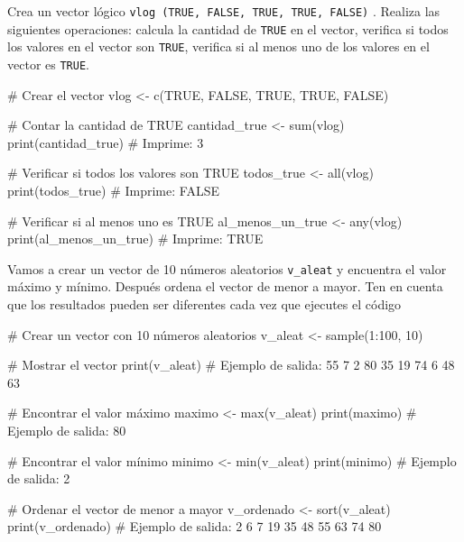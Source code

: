 \documentclass[
  letterpaper,
]{scrbook}
\newenvironment{Shaded}{\begin{snugshade}}{\end{snugshade}}
\newcommand{\CommentTok}[1]{\textcolor[rgb]{0.37,0.37,0.37}{#1}}
\newcommand{\ConstantTok}[1]{\textcolor[rgb]{0.56,0.35,0.01}{#1}}
\newcommand{\DecValTok}[1]{\textcolor[rgb]{0.68,0.00,0.00}{#1}}
\newcommand{\FunctionTok}[1]{\textcolor[rgb]{0.28,0.35,0.67}{#1}}
\newcommand{\NormalTok}[1]{\textcolor[rgb]{0.00,0.23,0.31}{#1}}
\newcommand{\OtherTok}[1]{\textcolor[rgb]{0.00,0.23,0.31}{#1}}
\newcommand{\SpecialCharTok}[1]{\textcolor[rgb]{0.37,0.37,0.37}{#1}}
\begin{document}
Crea un vector lógico
\texttt{vlog\ (TRUE,\ FALSE,\ TRUE,\ TRUE,\ FALSE)} . Realiza las
siguientes operaciones: calcula la cantidad de \texttt{TRUE} en el
vector, verifica si todos los valores en el vector son \texttt{TRUE},
verifica si al menos uno de los valores en el vector es \texttt{TRUE}.

\begin{Shaded}
\begin{Highlighting}[]
\CommentTok{\# Crear el vector}
\NormalTok{vlog }\OtherTok{\textless{}{-}} \FunctionTok{c}\NormalTok{(}\ConstantTok{TRUE}\NormalTok{, }\ConstantTok{FALSE}\NormalTok{, }\ConstantTok{TRUE}\NormalTok{, }\ConstantTok{TRUE}\NormalTok{, }\ConstantTok{FALSE}\NormalTok{)}

\CommentTok{\# Contar la cantidad de TRUE}
\NormalTok{cantidad\_true }\OtherTok{\textless{}{-}} \FunctionTok{sum}\NormalTok{(vlog)}
\FunctionTok{print}\NormalTok{(cantidad\_true)  }\CommentTok{\# Imprime: 3}

\CommentTok{\# Verificar si todos los valores son TRUE}
\NormalTok{todos\_true }\OtherTok{\textless{}{-}} \FunctionTok{all}\NormalTok{(vlog)}
\FunctionTok{print}\NormalTok{(todos\_true)  }\CommentTok{\# Imprime: FALSE}

\CommentTok{\# Verificar si al menos uno es TRUE}
\NormalTok{al\_menos\_un\_true }\OtherTok{\textless{}{-}} \FunctionTok{any}\NormalTok{(vlog)}
\FunctionTok{print}\NormalTok{(al\_menos\_un\_true)  }\CommentTok{\# Imprime: TRUE}
\end{Highlighting}
\end{Shaded}

Vamos a crear un vector de 10 números aleatorios \texttt{v\_aleat} y
encuentra el valor máximo y mínimo. Después ordena el vector de menor a
mayor. Ten en cuenta que los resultados pueden ser diferentes cada vez
que ejecutes el código

\begin{Shaded}
\begin{Highlighting}[]
\CommentTok{\# Crear un vector con 10 números aleatorios}
\NormalTok{v\_aleat }\OtherTok{\textless{}{-}} \FunctionTok{sample}\NormalTok{(}\DecValTok{1}\SpecialCharTok{:}\DecValTok{100}\NormalTok{, }\DecValTok{10}\NormalTok{)}

\CommentTok{\# Mostrar el vector}
\FunctionTok{print}\NormalTok{(v\_aleat)}
\CommentTok{\# Ejemplo de salida: 55  7  2  80 35 19 74  6 48 63}

\CommentTok{\# Encontrar el valor máximo}
\NormalTok{maximo }\OtherTok{\textless{}{-}} \FunctionTok{max}\NormalTok{(v\_aleat)}
\FunctionTok{print}\NormalTok{(maximo)}
\CommentTok{\# Ejemplo de salida: 80}

\CommentTok{\# Encontrar el valor mínimo}
\NormalTok{minimo }\OtherTok{\textless{}{-}} \FunctionTok{min}\NormalTok{(v\_aleat)}
\FunctionTok{print}\NormalTok{(minimo)}
\CommentTok{\# Ejemplo de salida: 2}

\CommentTok{\# Ordenar el vector de menor a mayor}
\NormalTok{v\_ordenado }\OtherTok{\textless{}{-}} \FunctionTok{sort}\NormalTok{(v\_aleat)}
\FunctionTok{print}\NormalTok{(v\_ordenado)}
\CommentTok{\# Ejemplo de salida: 2  6  7 19 35 48 55 63 74 80}
\end{Highlighting}
\end{Shaded}
\end{document}
